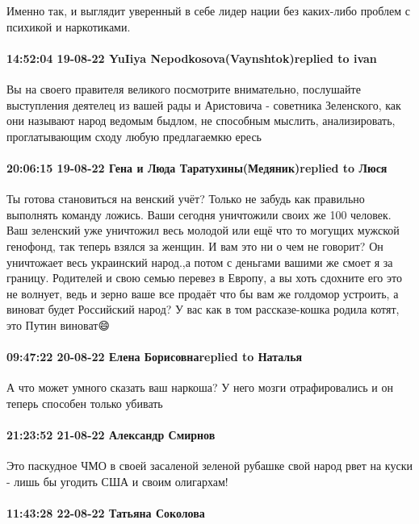 Именно так, и выглядит уверенный в себе лидер нации без каких-либо проблем с
психикой и наркотиками.

\paragraph{14:52:04 19-08-22 YuIiya Nepodkosova(Vaynshtok)replied to ivan}

Вы на своего правителя великого посмотрите внимательно, послушайте выступления
деятелец из вашей рады и Аристовича - советника Зеленского, как они называют
народ ведомым быдлом, не способным мыслить, анализировать, проглатывающим сходу
любую предлагаемкю ересь

\paragraph{20:06:15 19-08-22 Гена и Люда Таратухины(Медяник)replied to Люся}

Ты готова становиться на венский учёт? Только не забудь как правильно выполнять
команду ложись. Ваши сегодня уничтожили своих же 100 человек. Ваш зеленский уже
уничтожил весь молодой или ещё что то могущих мужской генофонд, так теперь
взялся за женщин. И вам это ни о чем не говорит? Он уничтожает весь украинский
народ.,а потом с деньгами вашими же смоет я за границу. Родителей и свою семью
перевез в Европу, а вы хоть сдохните его это не волнует, ведь и зерно ваше все
продаёт что бы вам же голдомор устроить, а виноват будет Российский народ? У
вас как в том рассказе-кошка родила котят, это Путин виноват😄

\paragraph{09:47:22 20-08-22 Елена Борисовнаreplied to Наталья}

А что может умного сказать ваш наркоша? У него мозги отрафировались и он теперь
способен только убивать

\paragraph{21:23:52 21-08-22 Александр Смирнов}

Это паскудное ЧМО в своей засаленой зеленой рубашке свой народ рвет на куски -
лишь бы угодить США и своим олигархам!

\paragraph{11:43:28 22-08-22 Татьяна Соколова}

